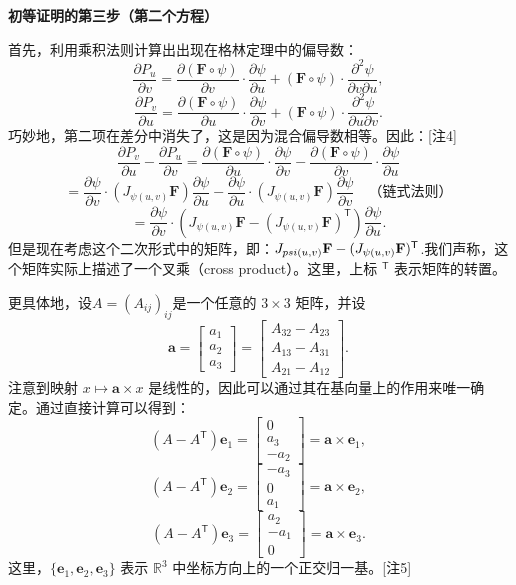 \textbf{初等证明的第三步（第二个方程）}

首先，利用乘积法则计算出出现在格林定理中的偏导数：
\[
\frac{\partial P_u}{\partial v} = \frac{\partial (\mathbf{F} \circ \psi)}{\partial v} \cdot \frac{\partial \psi}{\partial u} + (\mathbf{F} \circ \psi) \cdot \frac{\partial^2 \psi}{\partial v \partial u},~
\]
\[
\frac{\partial P_v}{\partial u} = \frac{\partial (\mathbf{F} \circ \psi)}{\partial u} \cdot \frac{\partial \psi}{\partial v} + (\mathbf{F} \circ \psi) \cdot \frac{\partial^2 \psi}{\partial u \partial v}.~
\]
巧妙地，第二项在差分中消失了，这是因为混合偏导数相等。因此：[注4]
\[
\frac{\partial P_v}{\partial u} - \frac{\partial P_u}{\partial v} 
= \frac{\partial (\mathbf{F} \circ \psi)}{\partial u} \cdot \frac{\partial \psi}{\partial v} 
- \frac{\partial (\mathbf{F} \circ \psi)}{\partial v} \cdot \frac{\partial \psi}{\partial u}~
\]
\[
= \frac{\partial \psi}{\partial v} \cdot (J_{\psi(u, v)} \mathbf{F}) \frac{\partial \psi}{\partial u} 
- \frac{\partial \psi}{\partial u} \cdot (J_{\psi(u, v)} \mathbf{F}) \frac{\partial \psi}{\partial v} 
\quad \text{（链式法则）}~
\]
\[
= \frac{\partial \psi}{\partial v} \cdot \left( J_{\psi(u, v)} \mathbf{F} - (J_{\psi(u, v)} \mathbf{F})^{\mathsf{T}} \right) \frac{\partial \psi}{\partial u}.~
\]
但是现在考虑这个二次形式中的矩阵，即：\(J_{\\psi(u, v)} \mathbf{F} - (J_{\psi(u, v)} \mathbf{F})^{\mathsf{T}}\).我们声称，这个矩阵实际上描述了一个叉乘（cross product）。这里，上标 \({}^{\mathsf{T}}\) 表示矩阵的转置。

更具体地，设\(A = (A_{ij})_{ij}\)是一个任意的 \(3 \times 3\) 矩阵，并设
\[
\mathbf{a} = 
\begin{bmatrix} 
a_1 \\ 
a_2 \\ 
a_3 
\end{bmatrix} = 
\begin{bmatrix} 
A_{32} - A_{23} \\ 
A_{13} - A_{31} \\ 
A_{21} - A_{12} 
\end{bmatrix}.~
\]
注意到映射 \(x \mapsto \mathbf{a} \times x\) 是线性的，因此可以通过其在基向量上的作用来唯一确定。通过直接计算可以得到：
\[
(A - A^{\mathsf{T}}) \mathbf{e}_1 = 
\begin{bmatrix} 
0 \\ 
a_3 \\ 
-a_2 
\end{bmatrix} = \mathbf{a} \times \mathbf{e}_1,~
\]
\[
(A - A^{\mathsf{T}}) \mathbf{e}_2 = 
\begin{bmatrix} 
-a_3 \\ 
0 \\ 
a_1 
\end{bmatrix} = \mathbf{a} \times \mathbf{e}_2,~
\]
\[
(A - A^{\mathsf{T}}) \mathbf{e}_3 = 
\begin{bmatrix} 
a_2 \\ 
-a_1 \\ 
0 
\end{bmatrix} = \mathbf{a} \times \mathbf{e}_3.~
\]
这里，\(\{\mathbf{e}_1, \mathbf{e}_2, \mathbf{e}_3\}\) 表示 \(\mathbb{R}^3\) 中坐标方向上的一个正交归一基。[注5]

